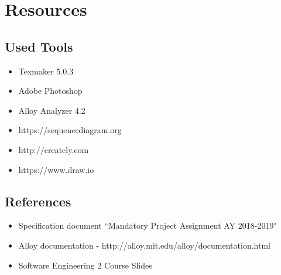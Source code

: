 \documentclass{article}
\begin{document}
\section{Resources}
\subsection{Used Tools}
\begin{itemize}
\item Texmaker 5.0.3
\item Adobe Photoshop
\item Alloy Analyzer 4.2
\item https://sequencediagram.org
\item http://creately.com
\item https://www.draw.io
\end{itemize}
\subsection{References}
\begin{itemize}
\item Specification document “Mandatory Project Assignment AY 2018-2019"
\item Alloy documentation - http://alloy.mit.edu/alloy/documentation.html
\item Software Engineering 2 Course Slides
\end{itemize}
\end{document}
